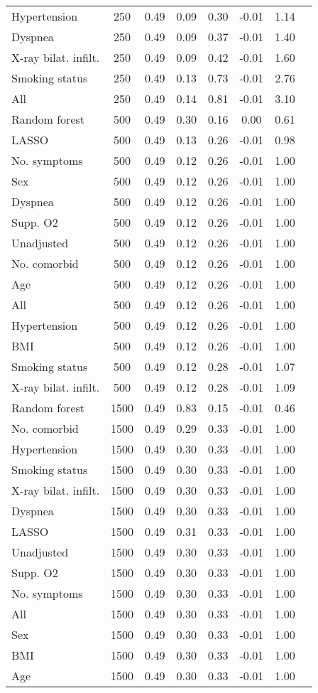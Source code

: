 \documentclass{article}
\begin{document}
{\begin{longtable}{lccccccc}
Hypertension & 250 & 0.49 & 0.09 & 0.30 & -0.01 & 1.14 \\ 
Dyspnea & 250 & 0.49 & 0.09 & 0.37 & -0.01 & 1.40 \\ 
X-ray bilat. infilt. & 250 & 0.49 & 0.09 & 0.42 & -0.01 & 1.60 \\ 
Smoking status & 250 & 0.49 & 0.13 & 0.73 & -0.01 & 2.76 \\ 
All & 250 & 0.49 & 0.14 & 0.81 & -0.01 & 3.10 \\ \midrule() 
Random forest & 500 & 0.49 & 0.30 & 0.16 &  0.00 & 0.61 \\ 
LASSO & 500 & 0.49 & 0.13 & 0.26 & -0.01 & 0.98 \\ 
No. symptoms & 500 & 0.49 & 0.12 & 0.26 & -0.01 & 1.00 \\ 
Sex & 500 & 0.49 & 0.12 & 0.26 & -0.01 & 1.00 \\ 
Dyspnea & 500 & 0.49 & 0.12 & 0.26 & -0.01 & 1.00 \\ 
Supp. O2 & 500 & 0.49 & 0.12 & 0.26 & -0.01 & 1.00 \\ 
Unadjusted & 500 & 0.49 & 0.12 & 0.26 & -0.01 & 1.00 \\ 
No. comorbid & 500 & 0.49 & 0.12 & 0.26 & -0.01 & 1.00 \\ 
Age & 500 & 0.49 & 0.12 & 0.26 & -0.01 & 1.00 \\ 
All & 500 & 0.49 & 0.12 & 0.26 & -0.01 & 1.00 \\ 
Hypertension & 500 & 0.49 & 0.12 & 0.26 & -0.01 & 1.00 \\ 
BMI & 500 & 0.49 & 0.12 & 0.26 & -0.01 & 1.00 \\ 
Smoking status & 500 & 0.49 & 0.12 & 0.28 & -0.01 & 1.07 \\ 
X-ray bilat. infilt. & 500 & 0.49 & 0.12 & 0.28 & -0.01 & 1.09 \\ \midrule() 
Random forest & 1500 & 0.49 & 0.83 & 0.15 & -0.01 & 0.46 \\ 
No. comorbid & 1500 & 0.49 & 0.29 & 0.33 & -0.01 & 1.00 \\ 
Hypertension & 1500 & 0.49 & 0.30 & 0.33 & -0.01 & 1.00 \\ 
Smoking status & 1500 & 0.49 & 0.30 & 0.33 & -0.01 & 1.00 \\ 
X-ray bilat. infilt. & 1500 & 0.49 & 0.30 & 0.33 & -0.01 & 1.00 \\ 
Dyspnea & 1500 & 0.49 & 0.30 & 0.33 & -0.01 & 1.00 \\ 
LASSO & 1500 & 0.49 & 0.31 & 0.33 & -0.01 & 1.00 \\ 
Unadjusted & 1500 & 0.49 & 0.30 & 0.33 & -0.01 & 1.00 \\ 
Supp. O2 & 1500 & 0.49 & 0.30 & 0.33 & -0.01 & 1.00 \\ 
No. symptoms & 1500 & 0.49 & 0.30 & 0.33 & -0.01 & 1.00 \\ 
All & 1500 & 0.49 & 0.30 & 0.33 & -0.01 & 1.00 \\ 
Sex & 1500 & 0.49 & 0.30 & 0.33 & -0.01 & 1.00 \\ 
BMI & 1500 & 0.49 & 0.30 & 0.33 & -0.01 & 1.00 \\ 
Age & 1500 & 0.49 & 0.30 & 0.33 & -0.01 & 1.00 \\
\bottomrule
\hline
\end{longtable}
}
\end{document}
